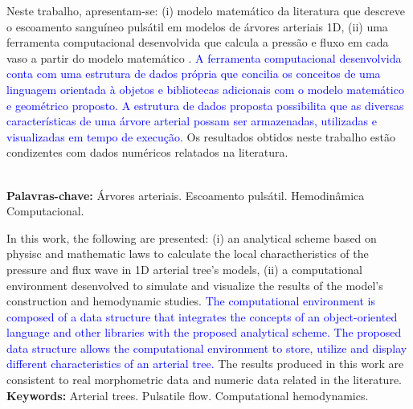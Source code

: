 \documentclass[a4paper,12pt]{monografia}
\theoremstyle{plain}
\theoremstyle{definition}
\theoremstyle{remark}
\begin{document}










Neste trabalho, apresentam-se: (i) modelo matemático da literatura que descreve o escoamento sanguíneo pulsátil em modelos de árvores arteriais 1D, (ii) uma ferramenta computacional desenvolvida que calcula a pressão e fluxo em cada vaso a partir do modelo matemático .
\textcolor{blue}{A ferramenta computacional desenvolvida conta com uma estrutura de dados própria que concilia os conceitos de uma linguagem orientada à objetos e bibliotecas adicionais com o modelo matemático e geométrico proposto.
A estrutura de dados proposta possibilita que as diversas características de uma árvore arterial possam ser armazenadas, utilizadas e visualizadas em tempo de execução.}
Os resultados obtidos neste trabalho estão condizentes com dados numéricos relatados na literatura.

\noindent \\ \textbf{Palavras-chave:} Árvores arteriais. Escoamento pulsátil. Hemodinâmica Computacional.




In this work, the following are presented: (i) an analytical scheme based on physisc and mathematic laws to calculate the local charactheristics of the pressure and flux wave in 1D arterial tree's models, (ii) a computational environment desenvolved to simulate and visualize the results of the model's construction and hemodynamic studies. 
\textcolor{blue}{The computational environment is composed of a data structure that integrates the concepts of an object-oriented language and other libraries with the proposed analytical scheme.
The proposed data structure allows the computational environment to store, utilize and display different characteristics of an arterial tree.} 
The results produced in this work are consistent to real morphometric data and numeric data related in the literature.
\noindent \\ \textbf{Keywords:} Arterial trees. Pulsatile flow. Computational hemodynamics. %
\end{document}
